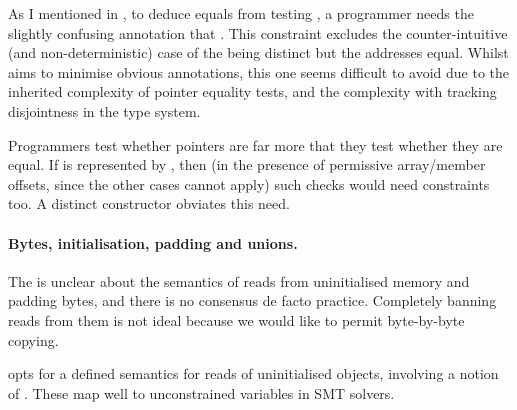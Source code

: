 As I mentioned in , to deduce  equals
 from testing , a programmer needs the slightly
confusing annotation that . %
This constraint excludes the counter-intuitive (and non-deterministic) case of
the  being distinct but the addresses equal. Whilst  aims
to minimise obvious annotations, this one seems difficult to avoid due to the
inherited complexity of pointer equality tests, and the complexity with
tracking  disjointness in the type system.

Programmers test whether pointers are  far more that they test
whether they are equal. If  is represented by , then (in the presence of permissive array/member offsets, since the other
cases cannot apply) such checks would need constraints too. A distinct
 constructor obviates this need.

\paragraph{Bytes, initialisation, padding and unions.}%
The  is unclear about the semantics of reads from
uninitialised memory and padding bytes, and there is no consensus de facto
practice. Completely banning reads from them is not ideal because we would like
to permit byte-by-byte copying.

 opts for a defined semantics for reads of uninitialised objects,
involving a notion of . These map well to
unconstrained variables in SMT solvers.

